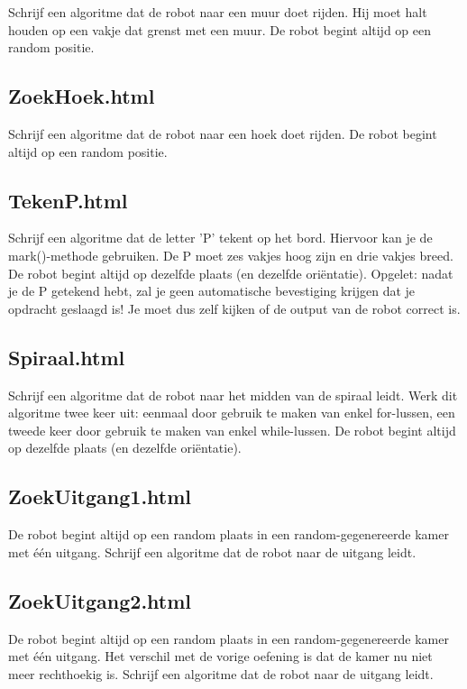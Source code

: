 Schrijf een algoritme dat de robot naar een muur doet rijden. Hij moet halt houden op een vakje dat grenst met een muur. De robot begint altijd op een random positie.

\subsection{ZoekHoek.html}

Schrijf een algoritme dat de robot naar een hoek doet rijden. De robot begint altijd op een random positie.

\subsection{TekenP.html}

Schrijf een algoritme dat de letter 'P' tekent op het bord. Hiervoor kan je de mark()-methode gebruiken. De P moet zes vakjes hoog zijn en drie vakjes breed. De robot begint altijd op dezelfde plaats (en dezelfde ori\"entatie). Opgelet: nadat je de P getekend hebt, zal je geen automatische bevestiging krijgen dat je opdracht geslaagd is! Je moet dus zelf kijken of de output van de robot correct is.

\subsection{Spiraal.html}

Schrijf een algoritme dat de robot naar het midden van de spiraal leidt. Werk dit algoritme twee keer uit: eenmaal door gebruik te maken van enkel for-lussen, een tweede keer door gebruik te maken van enkel while-lussen. De robot begint altijd op dezelfde plaats (en dezelfde ori\"entatie).

\subsection{ZoekUitgang1.html}

De robot begint altijd op een random plaats in een random-gegenereerde kamer met \'e\'en uitgang. Schrijf een algoritme dat de robot naar de uitgang leidt.

\subsection{ZoekUitgang2.html}

De robot begint altijd op een random plaats in een random-gegenereerde kamer met \'e\'en uitgang. Het verschil met de vorige oefening is dat de kamer nu niet meer rechthoekig is. Schrijf een algoritme dat de robot naar de uitgang leidt.

